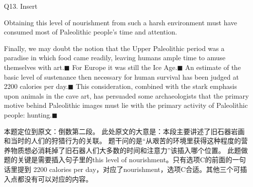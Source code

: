 \begin{blk}
    \begin{qst}
        Q13. Insert
    \end{qst}

    \begin{chc}
        Obtaining this level of nourishment from such a harsh environment must have consumed most of Paleolithic people’s time and attention.
    \end{chc}

    \begin{psgq}
        Finally, we may doubt the notion that the Upper Paleolithic period was a paradise in which food came readily, leaving humans ample time to amuse themselves with art.$\blacksquare$ For Europe it was still the Ice Age.$\blacksquare$ An estimate of the basic level of sustenance then necessary for human survival has been judged at 2200 calories per day.$\blacksquare$ This consideration, combined with the stark emphasis upon animals in the cave art, has persuaded some archaeologists that the primary motive behind Paleolithic images must lie with the primary activity of Paleolithic people: hunting.$\blacksquare$
    \end{psgq}

    \begin{nlz}
        本题定位到原文：倒数第二段。 此处原文的大意是：本段主要讲述了旧石器岩画和当时的人们的狩猎行为的关联。 题干问的是“从艰苦的环境里获得这种程度的营养物质想必消耗掉了旧石器人们大多数的时间和注意力”该插入哪个位置。 此题做题的关键是需要插入句子里的this level of nourishment。只有选项C的前面的一句话里提到 2200 calories per day，对应了nourishment，选项C合适。其他三个可插入点都没有可以对应的内容。
    \end{nlz}
\end{blk}

